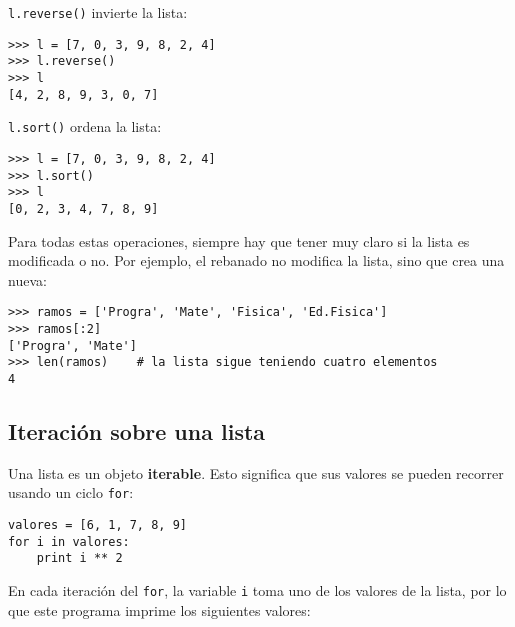\lstinline!l.reverse()! invierte la lista:

\begin{lstlisting}
>>> l = [7, 0, 3, 9, 8, 2, 4]
>>> l.reverse()
>>> l
[4, 2, 8, 9, 3, 0, 7]
\end{lstlisting}

\lstinline!l.sort()! ordena la lista:

\begin{lstlisting}
>>> l = [7, 0, 3, 9, 8, 2, 4]
>>> l.sort()
>>> l
[0, 2, 3, 4, 7, 8, 9]
\end{lstlisting}

Para todas estas operaciones, siempre hay que tener muy claro si la
lista es modificada o no. Por ejemplo, el rebanado no modifica la lista,
sino que crea una nueva:

\begin{lstlisting}
>>> ramos = ['Progra', 'Mate', 'Fisica', 'Ed.Fisica']
>>> ramos[:2]
['Progra', 'Mate']
>>> len(ramos)    # la lista sigue teniendo cuatro elementos
4
\end{lstlisting}

\subsection{Iteración sobre una lista}

Una lista es un objeto \textbf{iterable}. Esto significa que sus valores
se pueden recorrer usando un ciclo \lstinline!for!:

\begin{lstlisting}
valores = [6, 1, 7, 8, 9]
for i in valores:
    print i ** 2
\end{lstlisting}

En cada iteración del \lstinline!for!, la variable \lstinline!i! toma
uno de los valores de la lista, por lo que este programa imprime los
siguientes valores:
